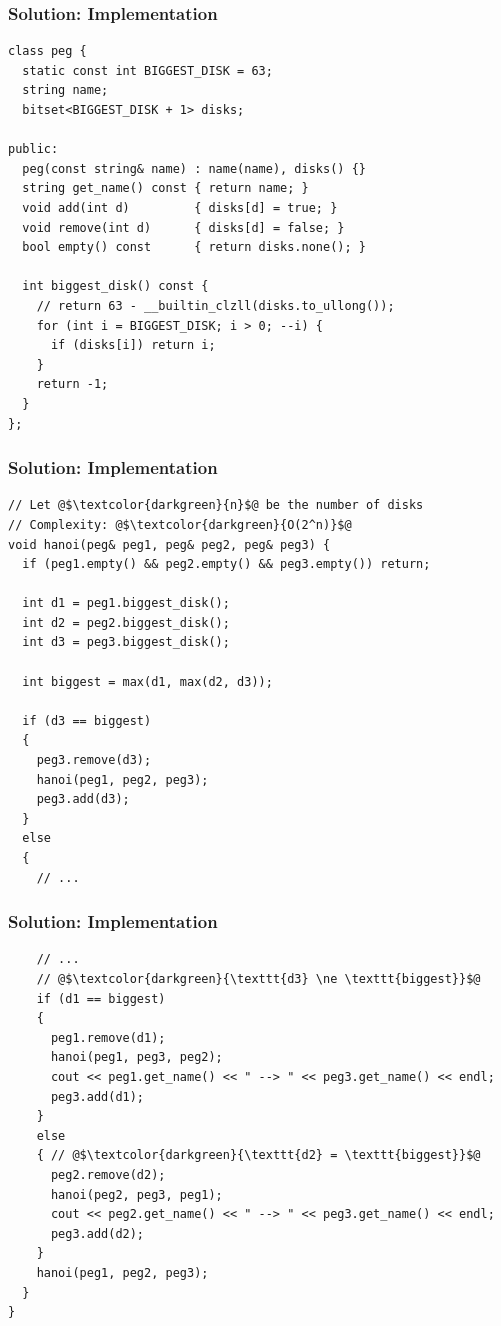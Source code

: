 \documentclass{beamer}
\begin{document}
\ifanswers

\begin{frame}[containsverbatim]
\frametitle{Solution: Implementation}

\scriptsize
\begin{lstlisting}
class peg {
  static const int BIGGEST_DISK = 63;
  string name;
  bitset<BIGGEST_DISK + 1> disks;

public:
  peg(const string& name) : name(name), disks() {}
  string get_name() const { return name; }
  void add(int d)         { disks[d] = true; }
  void remove(int d)      { disks[d] = false; }
  bool empty() const      { return disks.none(); }

  int biggest_disk() const {
    // return 63 - __builtin_clzll(disks.to_ullong());
    for (int i = BIGGEST_DISK; i > 0; --i) {
      if (disks[i]) return i;
    }
    return -1;
  }
};
\end{lstlisting}

\end{frame}

\begin{frame}[containsverbatim]
\frametitle{Solution: Implementation}

\scriptsize
\begin{lstlisting}
// Let @$\textcolor{darkgreen}{n}$@ be the number of disks
// Complexity: @$\textcolor{darkgreen}{O(2^n)}$@
void hanoi(peg& peg1, peg& peg2, peg& peg3) {
  if (peg1.empty() && peg2.empty() && peg3.empty()) return;

  int d1 = peg1.biggest_disk();
  int d2 = peg2.biggest_disk();
  int d3 = peg3.biggest_disk();

  int biggest = max(d1, max(d2, d3));

  if (d3 == biggest)
  {
    peg3.remove(d3);
    hanoi(peg1, peg2, peg3);
    peg3.add(d3);
  }
  else
  {
    // ...
\end{lstlisting}

\end{frame}

\begin{frame}[containsverbatim]
\frametitle{Solution: Implementation}

\scriptsize
\begin{lstlisting}
    // ...
    // @$\textcolor{darkgreen}{\texttt{d3} \ne \texttt{biggest}}$@
    if (d1 == biggest)
    {
      peg1.remove(d1);
      hanoi(peg1, peg3, peg2);
      cout << peg1.get_name() << " --> " << peg3.get_name() << endl;
      peg3.add(d1);
    }
    else
    { // @$\textcolor{darkgreen}{\texttt{d2} = \texttt{biggest}}$@
      peg2.remove(d2);
      hanoi(peg2, peg3, peg1);
      cout << peg2.get_name() << " --> " << peg3.get_name() << endl;
      peg3.add(d2);
    }
    hanoi(peg1, peg2, peg3);
  }
}
\end{lstlisting}

\end{frame}
\end{document}
